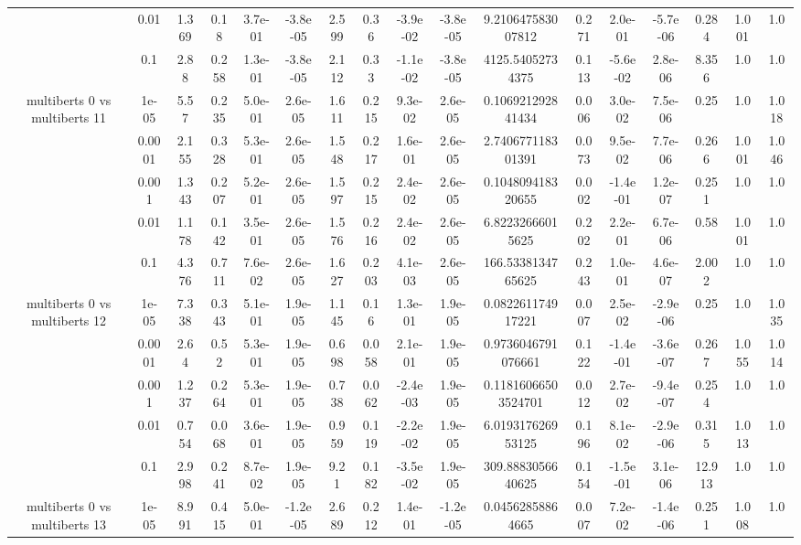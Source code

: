 \begin{tabular}{|c|c|c|c|c|c|c|c|c|c|c|c|c|c|c|c|c|}
 & 0.01 & 1.369 & 0.18 & 3.7e-01 & -3.8e-05 & 2.599 & 0.36 & -3.9e-02 & -3.8e-05 & 9.210647583007812 & 0.271 & 2.0e-01 & -5.7e-06 & 0.284 & 1.001 & 1.0 \\
 & 0.1 & 2.88 & 0.258 & 1.3e-01 & -3.8e-05 & 2.112 & 0.33 & -1.1e-02 & -3.8e-05 & 4125.54052734375 & 0.113 & -5.6e-02 & 2.8e-06 & 8.356 & 1.0 & 1.0 \\
\hline
\multirow{5}{*}{multiberts 0 vs multiberts 11} & 1e-05 & 5.57 & 0.235 & 5.0e-01 & 2.6e-05 & 1.611 & 0.215 & 9.3e-02 & 2.6e-05 & 0.106921292841434 & 0.006 & 3.0e-02 & 7.5e-06 & 0.25 & 1.0 & 1.018 \\
 & 0.0001 & 2.155 & 0.328 & 5.3e-01 & 2.6e-05 & 1.548 & 0.217 & 1.6e-01 & 2.6e-05 & 2.740677118301391 & 0.073 & 9.5e-02 & 7.7e-06 & 0.266 & 1.001 & 1.046 \\
 & 0.001 & 1.343 & 0.207 & 5.2e-01 & 2.6e-05 & 1.597 & 0.215 & 2.4e-02 & 2.6e-05 & 0.104809418320655 & 0.002 & -1.4e-01 & 1.2e-07 & 0.251 & 1.0 & 1.0 \\
 & 0.01 & 1.178 & 0.142 & 3.5e-01 & 2.6e-05 & 1.576 & 0.216 & 2.4e-02 & 2.6e-05 & 6.82232666015625 & 0.202 & 2.2e-01 & 6.7e-06 & 0.58 & 1.001 & 1.0 \\
 & 0.1 & 4.376 & 0.711 & 7.6e-02 & 2.6e-05 & 1.627 & 0.203 & 4.1e-03 & 2.6e-05 & 166.5338134765625 & 0.243 & 1.0e-01 & 4.6e-07 & 2.002 & 1.0 & 1.0 \\
\hline
\multirow{5}{*}{multiberts 0 vs multiberts 12} & 1e-05 & 7.338 & 0.343 & 5.1e-01 & 1.9e-05 & 1.145 & 0.16 & 1.3e-01 & 1.9e-05 & 0.082261174917221 & 0.007 & 2.5e-02 & -2.9e-06 & 0.25 & 1.0 & 1.035 \\
 & 0.0001 & 2.64 & 0.52 & 5.3e-01 & 1.9e-05 & 0.698 & 0.058 & 2.1e-01 & 1.9e-05 & 0.9736046791076661 & 0.122 & -1.4e-01 & -3.6e-07 & 0.267 & 1.055 & 1.014 \\
 & 0.001 & 1.237 & 0.264 & 5.3e-01 & 1.9e-05 & 0.738 & 0.062 & -2.4e-03 & 1.9e-05 & 0.11816066503524701 & 0.012 & 2.7e-02 & -9.4e-07 & 0.254 & 1.0 & 1.0 \\
 & 0.01 & 0.754 & 0.068 & 3.6e-01 & 1.9e-05 & 0.959 & 0.119 & -2.2e-02 & 1.9e-05 & 6.019317626953125 & 0.196 & 8.1e-02 & -2.9e-06 & 0.315 & 1.013 & 1.0 \\
 & 0.1 & 2.998 & 0.241 & 8.7e-02 & 1.9e-05 & 9.21 & 0.182 & -3.5e-02 & 1.9e-05 & 309.8883056640625 & 0.154 & -1.5e-01 & 3.1e-06 & 12.913 & 1.0 & 1.0 \\
\hline
\multirow{5}{*}{multiberts 0 vs multiberts 13} & 1e-05 & 8.991 & 0.415 & 5.0e-01 & -1.2e-05 & 2.689 & 0.212 & 1.4e-01 & -1.2e-05 & 0.04562858864665 & 0.007 & 7.2e-02 & -1.4e-06 & 0.251 & 1.008 & 1.0 \\

\end{tabular}
